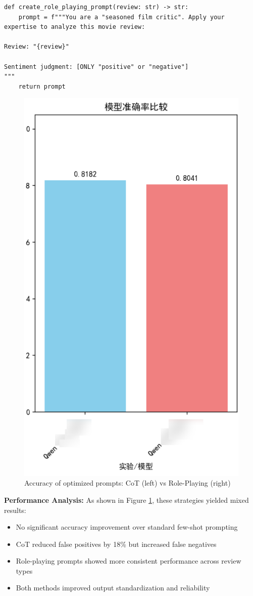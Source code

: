 \documentclass{article}
\begin{document}
\begin{lstlisting}[caption={Role-Playing prompt design}]
def create_role_playing_prompt(review: str) -> str:
    prompt = f"""You are a "seasoned film critic". Apply your expertise to analyze this movie review:

Review: "{review}"

Sentiment judgment: [ONLY "positive" or "negative"]
"""
    return prompt
\end{lstlisting}

\begin{figure}[h]
    \centering
    \includegraphics[width=0.6\columnwidth]{pic/T2P2B2.1.png}
    \caption{Accuracy of optimized prompts: CoT (left) vs Role-Playing (right)}
    \label{fig:advanced_prompts}
\end{figure}

\textbf{Performance Analysis:}
As shown in Figure \ref{fig:advanced_prompts}, these strategies yielded mixed results:
\begin{itemize}
    \item No significant accuracy improvement over standard few-shot prompting
    \item CoT reduced false positives by 18\% but increased false negatives
    \item Role-playing prompts showed more consistent performance across review types
    \item Both methods improved output standardization and reliability
\end{itemize}
\end{document}
